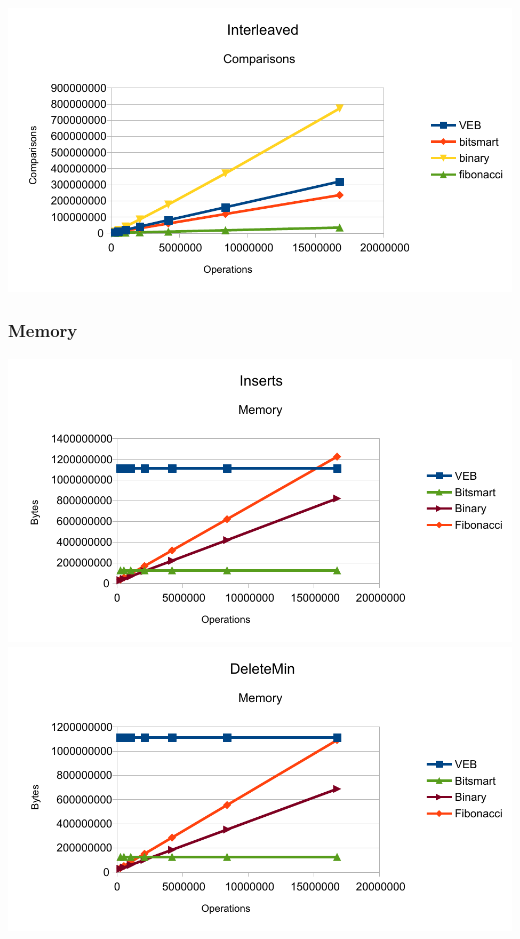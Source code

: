 \includegraphics[width=\textwidth]{graphs/Interleaved_comparisons.pdf}

\subsubsection{Memory}
\includegraphics[width=\textwidth]{graphs/Inserts_memory.pdf}
\includegraphics[width=\textwidth]{graphs/DeleteMin_memory.pdf}
